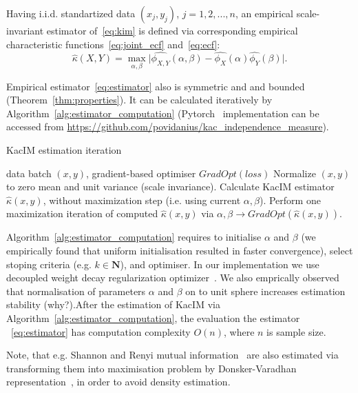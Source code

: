 \documentclass{article}
\begin{document}
Having i.i.d. standartized data $(x_{j}, y_{j})$, $j = 1,2,...,n$, an empirical scale-invariant estimator of~\eqref{eq:kim} is defined via corresponding empirical characteristic functions~\eqref{eq:joint_ecf} and~\eqref{eq:ecf}:
\begin{equation}
\label{eq:estimator}
    \hat{\kappa}(X,Y) = \max_{\alpha, \beta} \vert \widehat{\phi_{X,Y}}(\alpha,\beta)  - \widehat{\phi_{X}}(\alpha) \widehat{\phi_{Y}}(\beta) \vert.
\end{equation}

\noindent Empirical estimator~\eqref{eq:estimator} also is symmetric and and bounded (Theorem~\ref{thm:properties}). It can be calculated iteratively by Algorithm~\ref{alg:estimator_computation} (Pytorch~\cite{NEURIPS2019_9015} implementation can be accessed from \url{https://github.com/povidanius/kac_independence_measure}). 


\begin{algorithm}
\caption{KacIM estimation iteration}\label{alg:estimator_computation}
\begin{algorithmic}
\Require data batch $(x,y)$, gradient-based optimiser $GradOpt(loss)$
\State Normalize $(x,y)$ to zero mean and unit variance (scale invariance).
\State Calculate KacIM estimator $\hat{\kappa}(x,y)$, without maximization step (i.e. using current $\alpha, \beta$).
\State Perform one maximization iteration of computed $\hat{\kappa}(x,y)$ via $\alpha, \beta \rightarrow GradOpt(\hat{\kappa}(x,y))$.
\end{algorithmic}
\end{algorithm}




Algorithm~\ref{alg:estimator_computation} requires to initialise $\alpha$ and $\beta$ (we empirically found that uniform initialisation resulted in faster convergence), select stoping criteria (e.g. $k \in \mathbf{N}$), and optimiser. In our implementation we use decoupled weight decay regularization optimizer~\cite{Loshchilov2019DecoupledWD}. 
We also emprically observed that normalisation of parameters $\alpha$ and $\beta$ on to unit sphere increases estimation stability (why?).After the estimation of KacIM via Algorithm~\ref{alg:estimator_computation}, the evaluation the estimator ~\eqref{eq:estimator} has computation complexity $O(n)$, where $n$ is sample size.

Note, that e.g. Shannon and Renyi mutual information~\cite{Cover2006} are also estimated via transforming them into maximisation problem by Donsker-Varadhan representation~\cite{pmlr-v80-belghazi18a}, in order to avoid density estimation.
\end{document}
